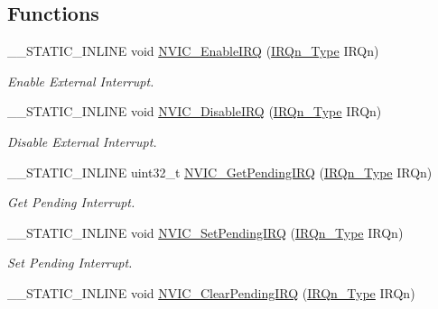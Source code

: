 \subsection*{Functions}
\begin{DoxyCompactItemize}
\item 
\-\_\-\-\_\-\-S\-T\-A\-T\-I\-C\-\_\-\-I\-N\-L\-I\-N\-E void \hyperlink{group___c_m_s_i_s___core___n_v_i_c_functions_ga3349f2e3580d7ce22d6530b7294e5921}{N\-V\-I\-C\-\_\-\-Enable\-I\-R\-Q} (\hyperlink{group___peripheral__interrupt__number__definition_ga7e1129cd8a196f4284d41db3e82ad5c8}{I\-R\-Qn\-\_\-\-Type} I\-R\-Qn)
\begin{DoxyCompactList}\small\item\em Enable External Interrupt. \end{DoxyCompactList}\item 
\-\_\-\-\_\-\-S\-T\-A\-T\-I\-C\-\_\-\-I\-N\-L\-I\-N\-E void \hyperlink{group___c_m_s_i_s___core___n_v_i_c_functions_ga260fba04ac8346855c57f091d4ee1e71}{N\-V\-I\-C\-\_\-\-Disable\-I\-R\-Q} (\hyperlink{group___peripheral__interrupt__number__definition_ga7e1129cd8a196f4284d41db3e82ad5c8}{I\-R\-Qn\-\_\-\-Type} I\-R\-Qn)
\begin{DoxyCompactList}\small\item\em Disable External Interrupt. \end{DoxyCompactList}\item 
\-\_\-\-\_\-\-S\-T\-A\-T\-I\-C\-\_\-\-I\-N\-L\-I\-N\-E uint32\-\_\-t \hyperlink{group___c_m_s_i_s___core___n_v_i_c_functions_gafec8042db64c0f8ed432b6c8386a05d8}{N\-V\-I\-C\-\_\-\-Get\-Pending\-I\-R\-Q} (\hyperlink{group___peripheral__interrupt__number__definition_ga7e1129cd8a196f4284d41db3e82ad5c8}{I\-R\-Qn\-\_\-\-Type} I\-R\-Qn)
\begin{DoxyCompactList}\small\item\em Get Pending Interrupt. \end{DoxyCompactList}\item 
\-\_\-\-\_\-\-S\-T\-A\-T\-I\-C\-\_\-\-I\-N\-L\-I\-N\-E void \hyperlink{group___c_m_s_i_s___core___n_v_i_c_functions_ga3ecf446519da33e1690deffbf5be505f}{N\-V\-I\-C\-\_\-\-Set\-Pending\-I\-R\-Q} (\hyperlink{group___peripheral__interrupt__number__definition_ga7e1129cd8a196f4284d41db3e82ad5c8}{I\-R\-Qn\-\_\-\-Type} I\-R\-Qn)
\begin{DoxyCompactList}\small\item\em Set Pending Interrupt. \end{DoxyCompactList}\item 
\-\_\-\-\_\-\-S\-T\-A\-T\-I\-C\-\_\-\-I\-N\-L\-I\-N\-E void \hyperlink{group___c_m_s_i_s___core___n_v_i_c_functions_ga332e10ef9605dc6eb10b9e14511930f8}{N\-V\-I\-C\-\_\-\-Clear\-Pending\-I\-R\-Q} (\hyperlink{group___peripheral__interrupt__number__definition_ga7e1129cd8a196f4284d41db3e82ad5c8}{I\-R\-Qn\-\_\-\-Type} I\-R\-Qn)

\end{DoxyCompactItemize}

